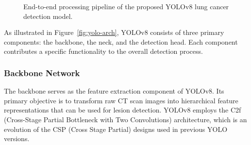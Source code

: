 \begin{figure}[H]
	\centering
	
	
	\caption{End-to-end processing pipeline of the proposed YOLOv8 lung cancer detection model.}
	\label{fig:yolo_pipeline}
\end{figure}

As illustrated in Figure~\ref{fig:yolo-arch}, YOLOv8 consists of three primary components: the backbone, the neck, and the detection head. Each component contributes a specific functionality to the overall detection process.

\subsubsection{Backbone Network}

The backbone serves as the feature extraction component of YOLOv8. Its primary objective is to transform raw CT scan images into hierarchical feature representations that can be used for lesion detection. YOLOv8 employs the C2f (Cross-Stage Partial Bottleneck with Two Convolutions) architecture, which is an evolution of the CSP (Cross Stage Partial) designs used in previous YOLO versions.

